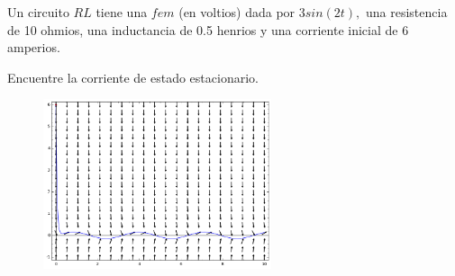 	\begin{problema}
		Un circuito $RL$ tiene una $fem$ (en voltios) dada por $3sin(2t),$ una resistencia de 10 ohmios, una inductancia de 0.5 henrios y una corriente inicial de 6 amperios.
		
		Encuentre la corriente de estado estacionario.
	\end{problema}
	


	\begin{figure}
		\centering
		\includegraphics[height=5cm,keepaspectratio=true]{./edo/img020505.png}
		\label{fig:020505}
	\end{figure}
	











